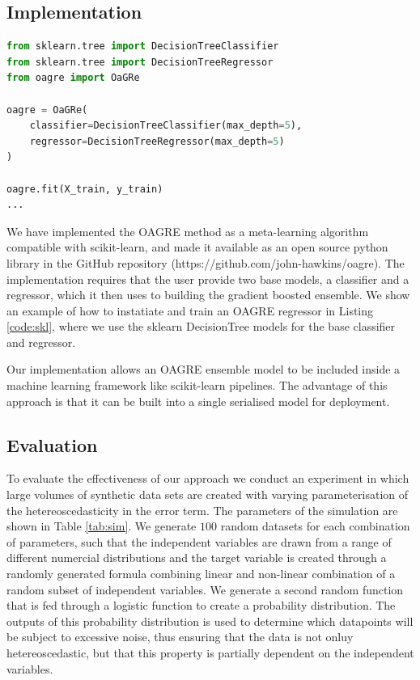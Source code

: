 \documentclass[12pt,a4paper]{article}
\begin{document}
\subsection{Implementation}
 
\begin{lstlisting}[language=Python,label={code:skl}, caption=Usage of OAGRE with scikit-learn models ]
from sklearn.tree import DecisionTreeClassifier
from sklearn.tree import DecisionTreeRegressor
from oagre import OaGRe

oagre = OaGRe(
    classifier=DecisionTreeClassifier(max_depth=5),
    regressor=DecisionTreeRegressor(max_depth=5)
)

oagre.fit(X_train, y_train)
...
\end{lstlisting}

We have implemented the OAGRE method as a meta-learning algorithm compatible with scikit-learn\cite{pedregosa2011scikit},
and made it available as an open source python library in the GitHub repository (https://github.com/john-hawkins/oagre).
The implementation requires that the user provide two base models, a classifier and a regressor, which it then uses to
building the gradient boosted ensemble. We show an example of how to instatiate and train an OAGRE regressor in
Listing \ref{code:skl}, where we use the sklearn DecisionTree models for the base classifier and regressor.

Our implementation allows an OAGRE ensemble model to be included inside a machine learning framework like
scikit-learn pipelines\cite{pedregosa2011scikit}. The advantage of this approach is that it can be built into a single
serialised model for deployment.

 
\subsection{Evaluation}

To evaluate the effectiveness of our approach we conduct an experiment in which large volumes of synthetic data
sets are created with varying parameterisation of the hetereoscedasticity in the error term. The parameters of
the simulation are shown in Table \ref{tab:sim}. We generate $100$ random datasets for each combination of 
parameters, such that the independent variables are drawn from a range of different numercial distributions
and the target variable is created through a randomly generated formula combining linear and non-linear 
combination of a random subset of independent variables. We generate a second random function that is fed
through a logistic function to create a probability distribution. The outputs of this probability distribution
is used to determine which datapoints will be subject to excessive noise, thus ensuring that the data is
not onluy hetereoscedastic, but that this property is partially dependent on the independent variables.
\end{document}
